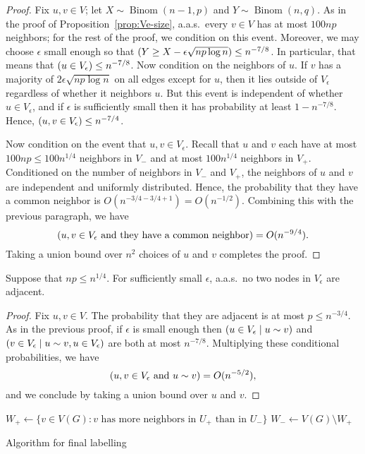 \documentclass[EJP]{ejpecp}
\newcommand{\1}[1]{\mathbbm{1}_{\{#1\}}}
\let\Pr\relax
\DeclareMathOperator{\Pr}{Pr}
\DeclareMathOperator{\Binom}{Binom}
\begin{document}
\begin{proof}
  Fix $u, v \in V$; let $X \sim \Binom(n-1, p)$
  and $Y \sim \Binom(n,q)$. As in the proof of
 Proposition~\ref{prop:Ve-size}, a.a.s.\ every $v \in V$ has at most
 $100np$ neighbors; for the rest of the proof, we condition on this
 event. Moreover, we may choose $\epsilon$
 small enough so that $\Pr(Y \ge X - \epsilon \sqrt{np \log n}) \le n^{-7/8}$.
 In particular, that means that $\Pr(u \in V_\epsilon) \le n^{-7/8}$. Now
 condition on the neighbors of $u$. If $v$ has a majority of
 $2\epsilon \sqrt{np \log n}$ on all edges except for $u$, then it lies outside
 of $V_\epsilon$ regardless of whether it neighbors $u$. But this event
 is independent of whether $u \in V_\epsilon$, and if $\epsilon$ is sufficiently
 small then it has probability
 at least $1-n^{-7/8}$. Hence, $\Pr(u, v \in V_\epsilon) \le n^{-7/4}$.

 Now condition on the event that $u, v \in V_\epsilon$.
 Recall that $u$ and $v$ each
 have at most $100np \le 100n^{1/4}$ neighbors in $V_-$ and at most
 $100n^{1/4}$ neighbors in $V_+$. Conditioned on the number of neighbors in $V_-$
 and $V_+$, the neighbors of $u$ and $v$ are independent and uniformly distributed.
 Hence, the probability that they have a common neighbor is $O(n^{-3/4 - 3/4 + 1})
 = O(n^{-1/2})$. Combining this with the previous paragraph, we have
 \[
  \Pr(u, v \in V_\epsilon \text{ and they have a common neighbor})
  = O(n^{-9/4}).
 \]
 Taking a union bound over $n^2$ choices of $u$ and $v$ completes the proof.
\end{proof}

\begin{proposition}\label{prop:Ve-adjacent}
 Suppose that $np \le n^{1/4}$. For sufficiently small $\epsilon$,
 a.a.s.\ no two nodes in $V_\epsilon$ are adjacent.
\end{proposition}

\begin{proof}
 Fix $u, v \in V$. The probability that they are adjacent
 is at most $p \le n^{-3/4}$.
 As in the previous proof, if $\epsilon$ is small enough
 then $\Pr(u \in V_\epsilon \mid u \sim v)$
 and $\Pr(v \in V_\epsilon \mid u \sim v, u \in V_\epsilon)$
 are both at most $n^{-7/8}$.
 Multiplying these conditional probabilities, we have
 \[
  \Pr(u, v \in V_\epsilon \text{ and } u \sim v)
  = O(n^{-5/2}),
 \]
 and we conclude by taking a union bound over $u$ and $v$.
\end{proof}


\begin{algorithm}
 \LinesNumbered

 \BlankLine

  $W_+ \leftarrow \{v \in V(G): \text{$v$ has more neighbors in $U_+$ than in $U_-$}\}$\;
  $W_- \leftarrow V(G) \setminus W_+$\;

\caption{Algorithm for final labelling}
\label{alg:second}
\end{algorithm}
\end{document}
